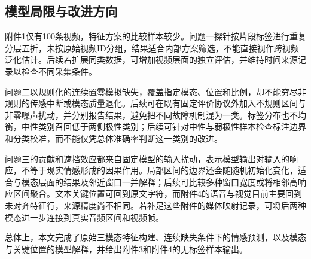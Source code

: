\subsection{模型局限与改进方向}\label{subsec:evaluation_limits}

附件1仅有100条视频，特征方案的比较样本较少。问题一探针按片段标签进行重复分层五折，未按原始视频ID分组，结果适合内部方案筛选，不能直接视作跨视频泛化估计。后续若扩展同类数据，可增加视频层面的独立评估，并维持时间来源记录以检查不同采集条件。

问题二以规则化的连续置零模拟缺失，覆盖指定模态、位置和比例，却不能穷尽非规则的传感中断或模态质量退化。后续可在既有固定评价协议外加入不规则区间与非零噪声扰动，并分别报告结果，避免把不同故障机制混为一类。标签分布也不均衡，中性类别召回低于两侧极性类别；后续可针对中性与弱极性样本检查标注边界和分类校准，而不能仅凭总体准确率判断这一类别的改进。

问题三的贡献和遮挡效应都来自固定模型的输入扰动，表示模型输出对输入的响应，不等于现实情感形成的因果作用。局部区间的边界还会随随机初始化变化，适合与模态层面的结果及邻近窗口一并解释；后续可比较多种窗口宽度或将相邻高响应区间聚合。文本关键位置可回到原文字符，而附件4的语音与视觉目前主要回到未对齐特征行，来源精度尚不相同。若补足这些附件的媒体映射记录，可将后两种模态进一步连接到真实音频区间和视频帧。

总体上，本文完成了原始三模态特征构建、连续缺失条件下的情感预测，以及模态与关键位置的模型解释，并给出附件3和附件4的无标签样本输出。
